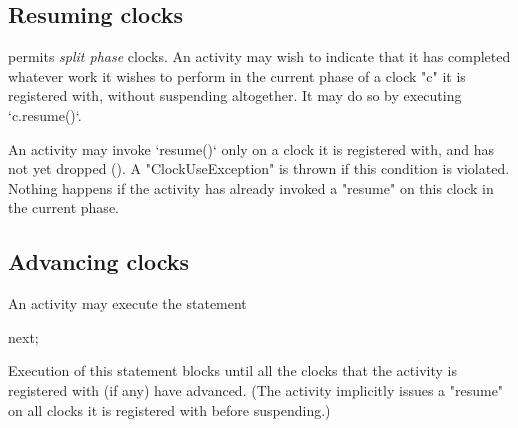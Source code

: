 \subsection{Resuming clocks}\label{resume}\label{sec:clock:resume}
\Xten{} permits {\em split phase} clocks. An activity may wish
to indicate that it has completed whatever work it wishes to perform
in the current phase of a  clock \xcd"c" it is registered with, without
suspending altogether. It may do so  by executing 
\xcd`c.resume()`.



An activity may invoke \xcd`resume()` only on a clock it is registered with,
and has not yet dropped (). A
\xcd"ClockUseException" is thrown if this
condition is violated. Nothing happens if the activity has already invoked a
\xcd"resume" on this clock in the current phase.


\subsection{Advancing clocks}\label{sec:clock:next}
An activity may execute the statement
\begin{xten}
next;
\end{xten}

\noindent 
Execution of this statement blocks until all the clocks that the
activity is registered with (if any) have advanced. (The activity
implicitly issues a \xcd"resume" on all clocks it is registered
with before suspending.)

